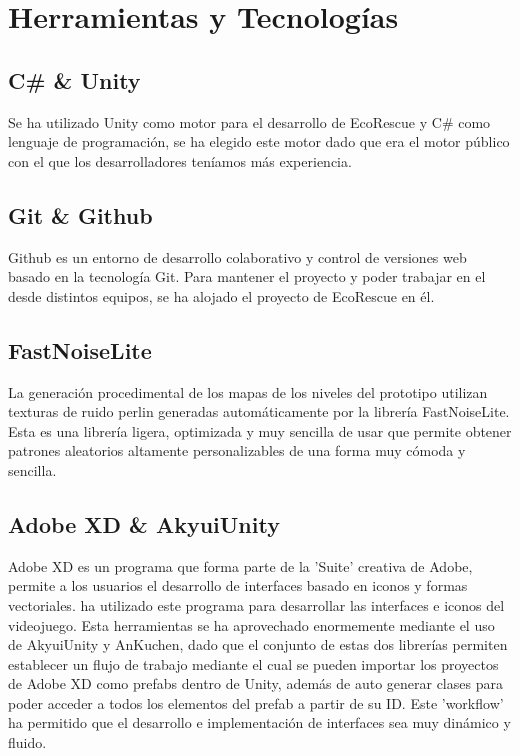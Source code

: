 \section{Herramientas y Tecnologías}

\subsection{C\# \& Unity}

Se ha utilizado Unity\cite{unity} como motor para el desarrollo de EcoRescue y C\#\cite{csharp} como lenguaje de programación, se ha elegido este motor dado que era el motor público con el que los desarrolladores teníamos más experiencia.

\subsection{Git \& Github}

Github\cite{github} es un entorno de desarrollo colaborativo y control de versiones web basado en la tecnología Git. Para mantener el proyecto y poder trabajar en el desde distintos equipos, se ha alojado el proyecto de EcoRescue\cite{Repo} en él.

\subsection{FastNoiseLite}

La generación procedimental de los mapas de los niveles del prototipo utilizan texturas de ruido perlin generadas automáticamente por la librería FastNoiseLite\cite{FastNoiseLite}. Esta es una librería ligera, optimizada y muy sencilla de usar que permite obtener patrones aleatorios altamente personalizables de una forma muy cómoda y sencilla.

\subsection{Adobe XD \& AkyuiUnity}

Adobe XD\cite{xd} es un programa que forma parte de la 'Suite' creativa de Adobe, permite a los usuarios el desarrollo de interfaces basado en iconos y formas vectoriales. \nombrecoautorespacio ha utilizado este programa para desarrollar las interfaces e iconos del videojuego. Esta herramientas se ha aprovechado enormemente mediante el uso de AkyuiUnity\cite{AkyuiUnity} y AnKuchen\cite{AnKuchen}, dado que el conjunto de estas dos librerías permiten establecer un flujo de trabajo mediante el cual se pueden importar los proyectos de Adobe XD como prefabs dentro de Unity, además de auto generar clases para poder acceder a todos los elementos del prefab a partir de su ID. Este 'workflow' ha permitido que el desarrollo e implementación de interfaces sea muy dinámico y fluido. 

